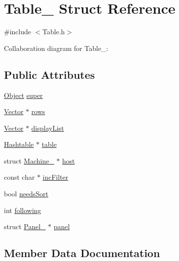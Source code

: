 \hypertarget{structTable__}{}\section{Table\+\_\+ Struct Reference}
\label{structTable__}


{\ttfamily \#include $<$Table.\+h$>$}



Collaboration diagram for Table\+\_\+\+:
\subsection*{Public Attributes}
\begin{DoxyCompactItemize}
\item 
\hyperlink{Object_8h_a32b67ad7134cd31b5ec5ed9c6a2d3978}{Object} \hyperlink{structTable___a74fd40edc0f1a4120871c2e0d84372ac}{super}
\item 
\hyperlink{Vector_8h_a8297b82ce917cd21838596b7e3a7faa8}{Vector} $\ast$ \hyperlink{structTable___ac293af9f357693e9c57a156d115591df}{rows}
\item 
\hyperlink{Vector_8h_a8297b82ce917cd21838596b7e3a7faa8}{Vector} $\ast$ \hyperlink{structTable___a0fe7968ad71fd33ea32725510cf96913}{display\+List}
\item 
\hyperlink{Hashtable_8h_af67f943dab16c5d7d465c18053edf47f}{Hashtable} $\ast$ \hyperlink{structTable___a640077da3b4571814a69890d7601b5fd}{table}
\item 
struct \hyperlink{structMachine__}{Machine\+\_\+} $\ast$ \hyperlink{structTable___a53a43dd93257c40cbc84b7e8377d5049}{host}
\item 
const char $\ast$ \hyperlink{structTable___a96929dc602bae3c935c2ec71db3512ab}{inc\+Filter}
\item 
bool \hyperlink{structTable___aa9eff55a1428f6ce77af28c155f539fb}{needs\+Sort}
\item 
int \hyperlink{structTable___a230269c75e5b304811b74e3d61a83a2a}{following}
\item 
struct \hyperlink{structPanel__}{Panel\+\_\+} $\ast$ \hyperlink{structTable___a6e8cbffb4956be9a2e161764ade6eb11}{panel}
\end{DoxyCompactItemize}


\subsection{Member Data Documentation}
\mbox{\label{structTable___a0fe7968ad71fd33ea32725510cf96913}} 
